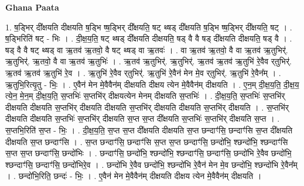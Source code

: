 \documentclass[17pt]{extarticle}
\begin{document}
\textbf{Ghana Paata } \newline

1. ष॒ड्भिर् दी᳚क्षयति दीक्षयति ष॒ड्भि ष्ष॒ड्भिर् दी᳚क्षयति॒ षट् थ्षड् दी᳚क्षयति ष॒ड्भि ष्ष॒ड्भिर् दी᳚क्षयति॒ षट् । . ष॒ड्भिरिति॑ षट् - भिः । . दी॒क्ष॒य॒ति॒ षट् थ्षड् दी᳚क्षयति दीक्षयति॒ षड् वै वै षड् दी᳚क्षयति दीक्षयति॒ षड् वै । . षड् वै वै षट् थ्षड् वा ऋ॒तव॑ ऋ॒तवो॒ वै षट् थ्षड् वा ऋ॒तवः॑ । . वा ऋ॒तव॑ ऋ॒तवो॒ वै वा ऋ॒तव॑ ऋ॒तुभिर्॑. ऋ॒तुभिर्॑. ऋ॒तवो॒ वै वा ऋ॒तव॑ ऋ॒तुभिः॑ । . ऋ॒तव॑ ऋ॒तुभिर्॑. ऋ॒तुभिर्॑. ऋ॒तव॑ ऋ॒तव॑ ऋ॒तुभि॑ रे॒वैव र्‌तुभिर्॑. ऋ॒तव॑ ऋ॒तव॑ ऋ॒तुभि॑ रे॒व । . ऋ॒तुभि॑ रे॒वैव र्‌तुभिर्॑. ऋ॒तुभि॑ रे॒वैन॑ मेन मे॒व र्‌तुभिर्॑. ऋ॒तुभि॑ रे॒वैन᳚म् । . ऋ॒तुभि॒रित्यृ॒तु - भिः॒ । . ए॒वैन॑ मेन मे॒वैवैन॑म् दीक्षयति दीक्षय त्येन मे॒वैवैन॑म् दीक्षयति । . ए॒न॒म् दी॒क्ष॒य॒ति॒ दी॒क्ष॒य॒ त्ये॒न॒ मे॒न॒म् दी॒क्ष॒य॒ति॒ स॒प्तभिः॑ स॒प्तभि॑र् दीक्षयत्येन मेनम् दीक्षयति स॒प्तभिः॑ । . दी॒क्ष॒य॒ति॒ स॒प्तभिः॑ स॒प्तभि॑र् दीक्षयति दीक्षयति स॒प्तभि॑र् दीक्षयति दीक्षयति स॒प्तभि॑र् दीक्षयति दीक्षयति स॒प्तभि॑र् दीक्षयति । . स॒प्तभि॑र् दीक्षयति दीक्षयति स॒प्तभिः॑ स॒प्तभि॑र् दीक्षयति स॒प्त स॒प्त दी᳚क्षयति स॒प्तभिः॑ स॒प्तभि॑र् दीक्षयति स॒प्त । . स॒प्तभि॒रिति॑ स॒प्त - भिः॒ । . दी॒क्ष॒य॒ति॒ स॒प्त स॒प्त दी᳚क्षयति दीक्षयति स॒प्त छन्दाꣳ॑सि॒ छन्दाꣳ॑सि स॒प्त दी᳚क्षयति दीक्षयति स॒प्त छन्दाꣳ॑सि । . स॒प्त छन्दाꣳ॑सि॒ छन्दाꣳ॑सि स॒प्त स॒प्त छन्दाꣳ॑सि॒ छन्दो॑भि॒ श्छन्दो॑भि॒ श्छन्दाꣳ॑सि स॒प्त स॒प्त छन्दाꣳ॑सि॒ छन्दो॑भिः । . छन्दाꣳ॑सि॒ छन्दो॑भि॒ श्छन्दो॑भि॒ श्छन्दाꣳ॑सि॒ छन्दाꣳ॑सि॒ छन्दो॑भि रे॒वैव छन्दो॑भि॒ श्छन्दाꣳ॑सि॒ छन्दाꣳ॑सि॒ छन्दो॑भिरे॒व । . छन्दो॑भि रे॒वैव छन्दो॑भि॒ श्छन्दो॑भि रे॒वैन॑ मेन मे॒व छन्दो॑भि॒ श्छन्दो॑भि रे॒वैन᳚म् । . छन्दो॑भि॒रिति॒ छन्दः॑ - भिः॒ । . ए॒वैन॑ मेन मे॒वैवैन॑म् दीक्षयति दीक्षय त्येन मे॒वैवैन॑म् दीक्षयति । \newline
\end{document}
